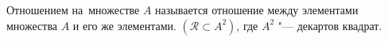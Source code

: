 
    Отношением на~множестве $A$ называется отношение между элементами множества $A$ и его же элементами. $(\mathcal R\subset A^2)$, где $A^2$ "--- декартов квадрат.
